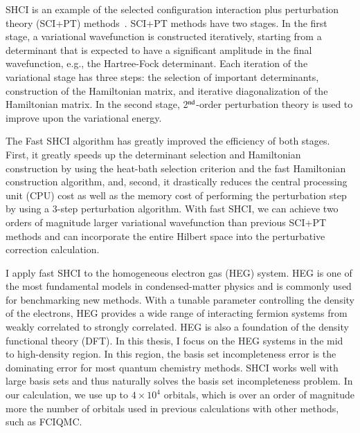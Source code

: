 \documentclass[phd,tocprelim]{cornell}
\begin{document}
SHCI is an example of the selected configuration interaction plus perturbation theory (SCI+PT)
methods~\cite{HurMalRan-JCP-73,BuePey-TCA-74,EvaDauMal-CP-83,CimPer-JCoP-87,Har-JCP-91,BytRue-CP-09,KelPerBarGre-JCP-14,CoeMurPat-CPL-14,Eva-JCP-14,SceAppGinCaf-JCoC-16,GarSceLooCaf-JCP-17,LooSceBloGarCafJac-JCP-18,TubLevHaiHeaWha-ARX-18}.
SCI+PT methods have two stages.
In the first stage, a variational wavefunction is constructed iteratively, starting from
a determinant that is expected to have a significant amplitude in the final wavefunction, e.g., the Hartree-Fock determinant.
Each iteration of the variational stage has three steps: the selection of important determinants, construction of the Hamiltonian matrix, and
iterative diagonalization of the Hamiltonian matrix.
In the second stage, 2$^{\rm nd}$-order perturbation theory is used to improve upon the variational energy.

The Fast SHCI algorithm has greatly improved the efficiency of both stages.
First, it greatly speeds up the determinant selection and Hamiltonian construction by using the heat-bath selection criterion and the fast Hamiltonian construction algorithm, and, second, it drastically reduces the central processing unit (CPU) cost as well as the memory cost of performing the perturbation step by using a 3-step perturbation algorithm.
With fast SHCI, we can achieve two orders of magnitude larger variational wavefunction than previous SCI+PT methods and can incorporate the entire Hilbert space into the perturbative correction calculation.

I apply fast SHCI to the homogeneous electron gas (HEG) system.
HEG is one of the most fundamental models in condensed-matter physics and is commonly used for benchmarking new methods.
With a tunable parameter controlling the density of the electrons, HEG provides a wide range of interacting fermion systems from weakly correlated to strongly correlated.
HEG is also a foundation of the density functional theory (DFT).
In this thesis, I focus on the HEG systems in the mid to high-density region.
In this region, the basis set incompleteness error is the dominating error for most quantum chemistry methods.
SHCI works well with large basis sets and thus naturally solves the basis set incompleteness problem.
In our calculation, we use up to $4\times10^4$ orbitals, which is over an order of magnitude more the number of orbitals used in previous calculations with other methods, such as FCIQMC.
\end{document}
